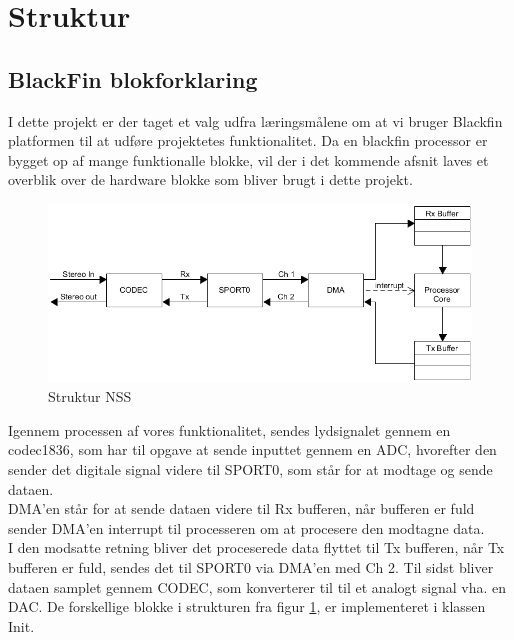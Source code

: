 \graphicspath{{Chapters/Struktur/}}

\section{Struktur}

\subsection{BlackFin blokforklaring}

I dette projekt er der taget et valg udfra læringsmålene om at vi bruger Blackfin platformen til at udføre projektetes funktionalitet. Da en blackfin processor er bygget op af mange funktionalle blokke, vil der i det kommende afsnit laves et overblik over de hardware blokke som bliver brugt i dette projekt. \cite{Struktur}

\begin{figure}[H]
	\centering
	\includegraphics[width = 400pt]{Img/Struktur}
	\caption{Struktur NSS}
	\label{fig:LMS_filter}
\end{figure}

Igennem processen af vores funktionalitet, sendes lydsignalet gennem en codec1836, som har til opgave at sende inputtet gennem en ADC, hvorefter den sender det digitale signal videre til SPORT0, som står for at modtage og sende dataen. \\

DMA'en står for at sende dataen videre til Rx bufferen, når bufferen er fuld sender DMA'en interrupt til processeren om at procesere den modtagne data. \\
I den modsatte retning bliver det proceserede data flyttet til Tx bufferen, når Tx bufferen er fuld, sendes det til SPORT0 via DMA'en med Ch 2.  
Til sidst bliver dataen samplet gennem CODEC, som konverterer til til et analogt signal vha. en DAC.
De forskellige blokke i strukturen fra figur \ref{fig:LMS_filter}, er implementeret i klassen Init. 
  

